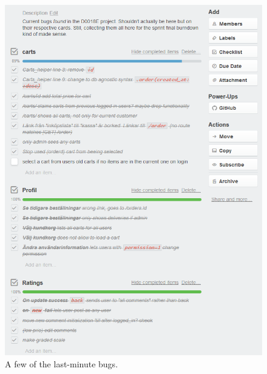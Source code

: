 \documentclass[paper=a4, fontsize=11pt]{report} %
\begin{document}
\begin{figure}
	\includegraphics{artifacts/bugs}
	\caption{A few of the last-minute bugs.}
	\label{fig:bugs}
\end{figure}

\end{document}
